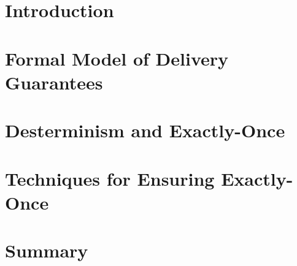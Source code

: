 \section{Introduction}


\section{Formal Model of Delivery Guarantees}

\label{fs-formalism}

\section{Desterminism and Exactly-Once}


\section{Techniques for Ensuring Exactly-Once}

\label{fs-eo-impl}


\section{Summary}